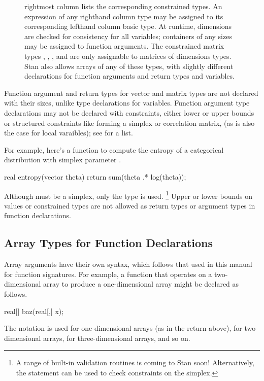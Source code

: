 \begin{figure}
{  rightmost column lists the corresponding constrained types.  An
  expression of any righthand column type may be assigned to its
  corresponding lefthand column basic type.  At runtime, dimensions
  are checked for consistency for all variables; containers of any
  sizes may be assigned to function arguments.  The constrained matrix
  types , ,
  , and
   are only assignable to matrices of
  dimensions  types. Stan also allows arrays of any
  of these types, with slightly different declarations for function
  arguments and return types and variables.
}\label{constrained-types.figure}
\end{figure}

Function argument and return types for vector and matrix types
are not declared with their sizes, unlike type declarations for variables.
Function argument type declarations may not be
declared with constraints, either lower or upper bounds or structured
constraints like forming a simplex or correlation matrix, (as is also
the case for local varaibles);  see
 for a list.

For example, here's a function to compute the entropy of a categorical
distribution with simplex parameter .
%
\begin{stancode}
real entropy(vector theta) {
  return sum(theta .* log(theta));
}
\end{stancode}
%
Although  must be a simplex, only the type 
is used.%
%
\footnote{A range of built-in validation routines is coming to Stan soon!
Alternatively, the  statement can be used to check
constraints on the simplex.}
%
Upper or lower bounds on values or constrained types are not allowed
as return types or argument types in function declarations.

\subsection{Array Types for Function Declarations}

Array arguments have their own syntax, which follows that used in this
manual for function signatures.  For example, a function that operates
on a two-dimensional array to produce a one-dimensional array might be
declared as follows.
%
\begin{stancode}
real[] baz(real[,] x);
\end{stancode}
%
The notation \code{[\,]} is used for one-dimensional arrays (as in the
return above), \code{[\,,\,]} for two-dimensional arrays,
\code{[\,,\,,\,]} for three-dimensional arrays, and so on.

